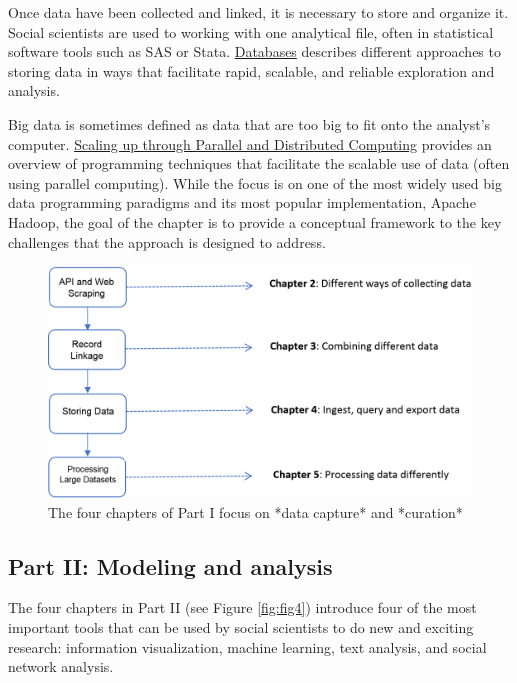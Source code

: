 \documentclass[]{krantz}
\begin{document}
Once data have been collected and linked, it is necessary to store and
organize it. Social scientists are used to working with one analytical
file, often in statistical software tools such as SAS or Stata.
\protect\hyperlink{chap:db}{Databases} describes different approaches to
storing data in ways that facilitate rapid, scalable, and reliable
exploration and analysis.

Big data is sometimes defined as data that are too big to fit onto the
analyst's computer. \protect\hyperlink{chap:parallel}{Scaling up through
Parallel and Distributed Computing} provides an overview of programming
techniques that facilitate the scalable use of data (often using
parallel computing). While the focus is on one of the most widely used
big data programming paradigms and its most popular implementation,
Apache Hadoop, the goal of the chapter is to provide a conceptual
framework to the key challenges that the approach is designed to
address.

\begin{figure}

{\centering \includegraphics[width=0.9\linewidth]{ChapterIntro/figures/Figure2_new} 

}

\caption{The four chapters of Part I focus on *data capture* and *curation*}\label{fig:fig3}
\end{figure}

\subsection{Part II: Modeling and
analysis}\label{part-ii-modeling-and-analysis}

The four chapters in Part II (see Figure \ref{fig:fig4}) introduce four
of the most important tools that can be used by social scientists to do
new and exciting research: information visualization, machine learning,
text analysis, and social network analysis.
\end{document}
